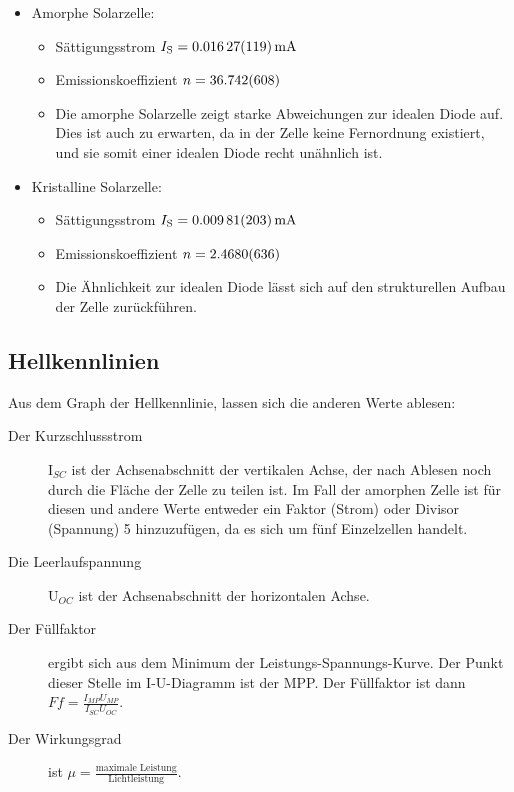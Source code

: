 \documentclass[12pt,a4paper,ngerman]{report}
\begin{document}
		\begin{samepage}
		\begin{itemize}
			\item Amorphe Solarzelle:
				\begin{itemize}
					\item Sättigungsstrom $I_\text{S} = \SI{0,01627+-0,00119}{\milli\ampere}$
					\item Emissionskoeffizient $n = \num{36,742 +- 0,608}$\\
					\item Die amorphe Solarzelle zeigt starke Abweichungen
zur idealen Diode auf. Dies ist auch zu erwarten, da in der Zelle keine Fernordnung
existiert, und sie somit einer idealen Diode recht unähnlich ist.
				\end{itemize}
			\item Kristalline Solarzelle:
				\begin{itemize}
					\item Sättigungsstrom $I_\text{S} = \SI{0,00981+-0,00203}{\milli\ampere}$
					\item Emissionskoeffizient $n = \num{2,468 +- 0,0636}$
					\item Die Ähnlichkeit zur idealen Diode lässt sich
auf den strukturellen Aufbau der Zelle zurückführen.
				\end{itemize}
		\end{itemize}
		\end{samepage}

	\subsection{Hellkennlinien}

		Aus dem Graph der Hellkennlinie, lassen sich die anderen Werte ablesen:
		
		\begin{description}
		\item[Der Kurzschlussstrom] I$_{SC}$ ist der Achsenabschnitt der vertikalen Achse, der nach Ablesen noch durch die Fläche der Zelle zu teilen ist. Im Fall der amorphen Zelle ist für diesen und andere Werte entweder ein Faktor (Strom) oder Divisor (Spannung) 5 hinzuzufügen, da es sich um fünf Einzelzellen handelt.
		\item[Die Leerlaufspannung] U$_{OC}$ ist der Achsenabschnitt der horizontalen Achse.
		\item[Der Füllfaktor] ergibt sich aus dem Minimum der Leistungs-Spannungs-Kurve. Der Punkt dieser Stelle im I-U-Diagramm ist der MPP. Der Füllfaktor ist dann $Ff=\frac{I_{MP}U_{MP}}{I_{SC}U_{OC}}$.
		\item[Der Wirkungsgrad] ist $\mu=\frac{\text{maximale Leistung}}{\text{Lichtleistung}}$.
		\end{description}
		
\end{document}

